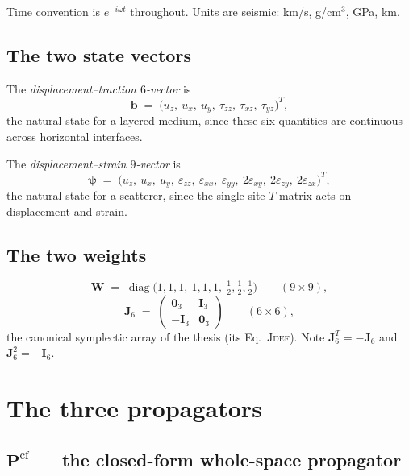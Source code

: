 \documentclass[11pt,a4paper]{article}
\newcommand{\bI}{\mathbf{I}}
\newcommand{\bJ}{\mathbf{J}}
\newcommand{\bW}{\mathbf{W}}
\newcommand{\bP}{\mathbf{P}}
\begin{document}
Time convention is $e^{-i\omega t}$ throughout.  Units are seismic: km/s,
g/cm$^3$, GPa, km.

\subsection{The two state vectors}

The \emph{displacement--traction $6$-vector} is
\begin{equation}\label{eq:b6}
  \mathbf{b} \;=\; \bigl(u_z,\ u_x,\ u_y,\ \tau_{zz},\ \tau_{xz},\ \tau_{yz}\bigr)^{T},
\end{equation}
the natural state for a layered medium, since these six quantities are
continuous across horizontal interfaces.

The \emph{displacement--strain $9$-vector} is
\begin{equation}\label{eq:v9}
  \boldsymbol{\psi} \;=\;
  \bigl(u_z,\ u_x,\ u_y,\
        \varepsilon_{zz},\ \varepsilon_{xx},\ \varepsilon_{yy},\
        2\varepsilon_{xy},\ 2\varepsilon_{zy},\ 2\varepsilon_{zx}\bigr)^{T},
\end{equation}
the natural state for a scatterer, since the single-site $T$-matrix acts on
displacement and strain.

\subsection{The two weights}

\begin{equation}\label{eq:W}
  \bW \;=\; \operatorname{diag}\bigl(1,1,1,\ 1,1,1,\ \tfrac12,\tfrac12,\tfrac12\bigr)
  \qquad (9\times9),
\end{equation}
\begin{equation}\label{eq:J6}
  \bJ_6 \;=\;
  \begin{pmatrix} \mathbf{0}_3 & \bI_3 \\ -\bI_3 & \mathbf{0}_3 \end{pmatrix}
  \qquad (6\times6),
\end{equation}
the canonical symplectic array of the thesis (its Eq.~\textsc{Jdef}).  Note
$\bJ_6^{T} = -\bJ_6$ and $\bJ_6^2 = -\bI_6$.

\section{The three propagators}

\subsection{$\bP^{\text{cf}}$ --- the closed-form whole-space propagator}
\end{document}
